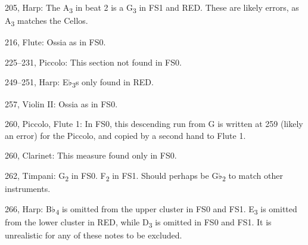 \documentclass[twoside]{article}
\begin{document}
\begin{hangparas}{15pt}{1}
\begin{multicols}{2}
205, Harp: The A\textsubscript{3} in beat 2 is a G\textsubscript{3} in FS1 and RED. These are likely errors, as A\textsubscript{3} matches the Cellos.

216, Flute: Ossia as in FS0.

225--231, Piccolo: This section not found in FS0.

249--251, Harp: E♭\textsubscript{3}s only found in RED.

257, Violin II: Ossia as in FS0.

260, Piccolo, Flute 1: In FS0, this descending run from G is written at 259 (likely an error) for the Piccolo, and copied by a second hand to Flute 1.

260, Clarinet: This measure found only in FS0.

262, Timpani: G\textsubscript{2} in FS0. F\textsubscript{2} in FS1. Should perhaps be G♭\textsubscript{2} to match other instruments.

266, Harp: B♭\textsubscript{4} is omitted from the upper cluster in FS0 and FS1. E\textsubscript{3} is omitted from the lower cluster in RED, while D\textsubscript{3} is omitted in FS0 and FS1. It is unrealistic for any of these notes to be excluded.

\end{multicols}

\end{hangparas}
\end{document}
